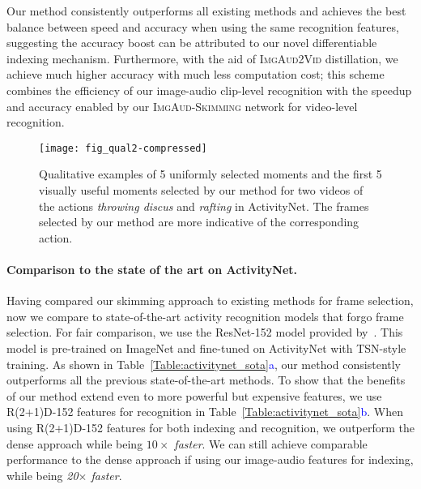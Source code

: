 Our method consistently outperforms all existing methods and achieves the best balance between speed and accuracy when using the same recognition features, suggesting the accuracy boost can be attributed to our novel differentiable indexing mechanism. Furthermore, with the aid of \textsc{ImgAud2Vid} distillation, we achieve much higher accuracy with much less computation cost; this scheme combines the efficiency of our image-audio clip-level recognition with the speedup and accuracy enabled by our \textsc{ImgAud-Skimming} network for video-level recognition.

\begin{figure}
    \center
    \texttt{[image: fig\_qual2-compressed]}
    \caption{Qualitative examples of 5 uniformly selected moments and the first 5 visually useful moments selected by our method for two videos of the actions \emph{throwing discus} and \emph{rafting} in ActivityNet. The frames selected by our method are more indicative of the corresponding action. \vspace{-0.2in}
    }
    \label{fig:qualitative_examples}
    \vspace{-0.1in}
\end{figure}

\paragraph{Comparison to the state of the art
on ActivityNet.} 
Having compared our skimming approach to existing methods for frame selection, now we compare to state-of-the-art activity recognition models that forgo frame selection. For fair comparison, we use the ResNet-152 model provided by~\cite{wu2019multiagent}. This model is pre-trained on ImageNet and fine-tuned on ActivityNet with TSN-style~\cite{wang2016temporal} training. As shown in Table~\ref{Table:activitynet_sota}\textcolor{blue}{a}, our method consistently outperforms all the previous state-of-the-art methods. To show that the benefits of our method extend even to more powerful but expensive features, we use R(2+1)D-152 features for recognition in Table~\ref{Table:activitynet_sota}\textcolor{blue}{b}. When using R(2+1)D-152 features for both indexing and recognition, we outperform the dense approach while being \emph{$10\times$ faster}. We can still achieve comparable performance to the dense approach if using our image-audio features for indexing, while being \emph{20$\times$ faster}.

